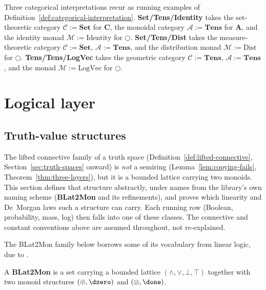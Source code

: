 Three categorical interpretations recur as running examples of
Definition~\ref{def:categorical-interpretation}.
\textbf{Set/Tens/Identity} takes the set-theoretic category
$\mathcal C := \mathbf{Set}$ for $\mathbf C$, the monoidal category
$\mathcal A := \mathbf{Tens}$ for $\mathbf A$, and the identity monad
$\mathcal M := \mathrm{Identity}$ for $\bigcirc$. \textbf{Set/Tens/Dist}
takes the measure-theoretic category $\mathcal C := \mathbf{Set}$,
$\mathcal A := \mathbf{Tens}$, and the distribution monad
$\mathcal M := \mathrm{Dist}$ for $\bigcirc$. \textbf{Tens/Tens/LogVec}
takes the geometric category $\mathcal C := \mathbf{Tens}$,
$\mathcal A := \mathbf{Tens}$, and the monad
$\mathcal M := \mathrm{LogVec}$ for $\bigcirc$.

\section{Logical layer}  %
\label{sec:logical-layer}

\subsection{Truth-value structures}  %
\label{sec:truth-structures}

The lifted connective family of a truth space
(Definition~\ref{def:lifted-connective}, Section~\ref{sec:truth-spaces}
onward) is \emph{not} a semiring (Lemma~\ref{lem:copying-fails},
Theorem~\ref{thm:three-layers}), but it is a bounded lattice carrying
two monoids. This section defines that structure abstractly, under
names from the library's own naming scheme (\textbf{BLat2Mon} and its
refinements), and proves which linearity and De~Morgan laws such a
structure can carry. Each running row (Boolean, probability, mass,
log) then falls into one of these classes. The connective and
constant conventions above are assumed throughout, not re-explained.

The BLat2Mon family below borrows some of its vocabulary from linear
logic, due to \citet{girardLinearLogic1987}.

\begin{class}
\label{def:blat2mon}
\leanok
A \textbf{BLat2Mon} is a set carrying a bounded lattice
$(\wedge,\vee,\bot,\top)$ together with two monoid structures
$(\oplus,\dzero)$ and $(\otimes,\done)$.
\end{class}

